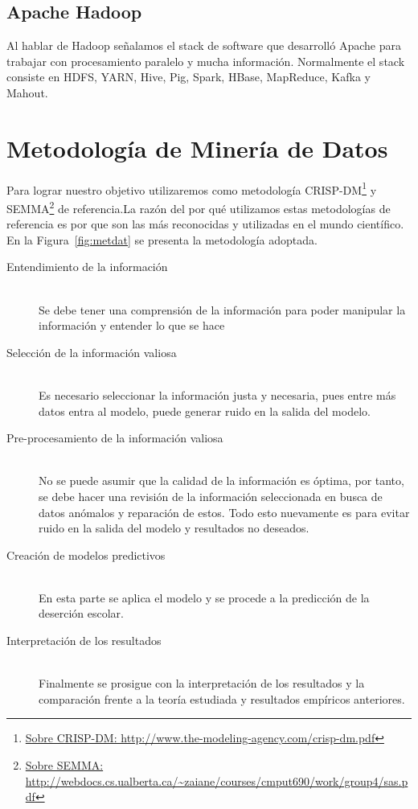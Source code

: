 \subsection{Apache Hadoop\cite{hadoop}}
Al hablar de Hadoop señalamos el stack de software que desarrolló Apache para trabajar con procesamiento paralelo y mucha información. Normalmente el stack consiste en HDFS, YARN, Hive, Pig, Spark, HBase, MapReduce, Kafka y Mahout.
\section{Metodología de Minería de Datos}
Para lograr nuestro objetivo utilizaremos como metodología CRISP-DM\footnote{\url{Sobre CRISP-DM: http://www.the-modeling-agency.com/crisp-dm.pdf}} y SEMMA\footnote{\url{Sobre SEMMA: http://webdocs.cs.ualberta.ca/~zaiane/courses/cmput690/work/group4/sas.pdf}} de referencia.La razón del por qué utilizamos estas metodologías de referencia es por que son las más reconocidas y utilizadas en el mundo científico\cite{crispol,crispol2,crispol3}. En la Figura~\ref{fig:metdat} se presenta la metodología adoptada.
\begin{description}
  \item[Entendimiento de la información] \hfill \\
  Se debe tener una comprensión de la información para poder manipular la información y entender lo que se hace
  \item[Selección de la información valiosa] \hfill \\
  Es necesario seleccionar la información justa y necesaria, pues entre más datos entra al modelo, puede generar ruido en la salida del modelo.
  \item[Pre-procesamiento de la información valiosa] \hfill \\
  No se puede asumir que la calidad de la información es óptima, por tanto, se debe hacer una revisión de la información seleccionada en busca de datos anómalos y reparación de estos. Todo esto nuevamente  es para evitar ruido en la salida del modelo y resultados no deseados.
  \item[Creación de modelos predictivos] \hfill \\
  En esta parte se aplica el modelo y se procede a la predicción de la deserción escolar.
  \item[Interpretación de los resultados] \hfill \\
  Finalmente se prosigue con la interpretación de los resultados y la comparación frente a la teoría estudiada y resultados empíricos anteriores.
\end{description}

